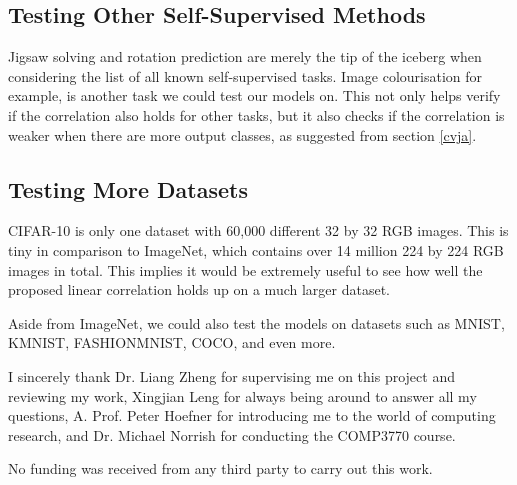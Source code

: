 \documentclass{article}
\begin{document}
\subsection{Testing Other Self-Supervised Methods}
Jigsaw solving and rotation prediction are merely the tip of the iceberg when considering the list of all known self-supervised tasks. Image colourisation for example, is another task we could test our models on. This not only helps verify if the correlation also holds for other tasks, but it also checks if the correlation is weaker when there are more output classes, as suggested from section \ref{cvja}.

\subsection{Testing More Datasets}
CIFAR-10 is only one dataset with 60,000 different 32 by 32 RGB images. This is tiny in comparison to ImageNet, which contains over 14 million 224 by 224 RGB images in total. This implies it would be extremely useful to see how well the proposed linear correlation holds up on a much larger dataset. 

Aside from ImageNet, we could also test the models on datasets such as MNIST, KMNIST, FASHIONMNIST, COCO, and even more.

\begin{ack}
I sincerely thank Dr. Liang Zheng for supervising me on this project and reviewing my work, Xingjian Leng for always being around to answer all my questions, A. Prof. Peter Hoefner for introducing me to the world of computing research, and Dr. Michael Norrish for conducting the COMP3770 course.

No funding was received from any third party to carry out this work.
\end{ack}


{
\small



}

\end{document}
